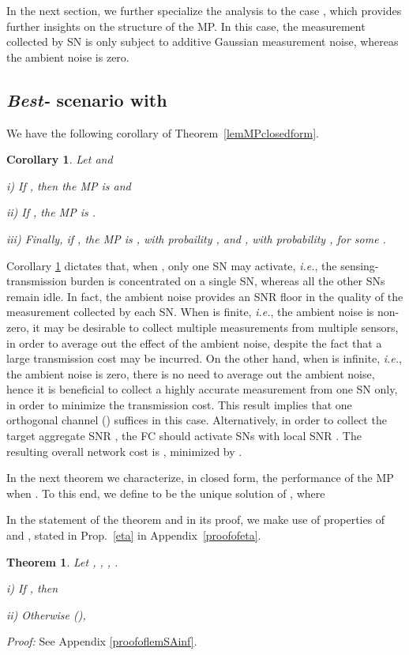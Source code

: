 \documentclass[10pt,twocolumn,twoside]{IEEEtran}
\newtheorem{thm}{Theorem}
\newtheorem{corol}{Corollary}
\theoremstyle{plain}
\begin{document}
In the next section, we further specialize the analysis to the case , which provides further insights on the structure of the MP. In this case, the measurement  collected by SN  is only subject to
additive Gaussian measurement noise, whereas the ambient noise is zero.
\vspace{-3mm}
\subsection{\emph{Best-} scenario with }
\noindent We have the following corollary of Theorem~\ref{lemMPclosedform}.
\begin{corol}
\label{corolMPclosedform}
Let 
and


\noindent \emph{i)} If  , then the MP is  and


\noindent \emph{ii)} If , the MP is .

\noindent \emph{iii)} Finally, if , the MP is
,  with probaility ,
and
 ,  with probability , for some .
\end{corol}
Corollary \ref{corolMPclosedform}
 dictates that, when , only one SN may activate, \emph{i.e.}, the sensing-transmission burden
 is concentrated on a single SN, whereas all the other SNs remain idle.
In fact, the ambient noise provides an SNR floor in the quality of the measurement collected by each SN.
When  is finite, \emph{i.e.}, the ambient noise is non-zero, it may be desirable to collect multiple measurements from multiple sensors, in order to average out the effect 
of the ambient noise, despite the fact that a large transmission cost may be incurred.
On the other hand, when  is infinite, \emph{i.e.}, the ambient noise is zero, there is no need to average out the ambient noise, hence it is beneficial to 
collect a highly accurate measurement from one SN only, in order to minimize the transmission cost.
This result implies that one orthogonal channel () suffices in this case.
Alternatively, in order to collect the target aggregate SNR , the FC should activate 
  SNs with local SNR .
 The resulting overall network cost is
 , minimized by .
  

 
 
 
In the next theorem we characterize, in closed form, the performance of the MP when .
To this end, we define
  to be the unique solution of , where
 
In the statement of the theorem and in its proof, we make use of properties of  and , stated in Prop.~\ref{eta} in Appendix~\ref{proofofeta}.
\begin{thm}
\label{lemSAinf}
Let , , , .

\noindent \emph{i)} If , then


\noindent \emph{ii)} Otherwise (),

\end{thm}
\noindent\emph{Proof:}
See  Appendix \ref{proofoflemSAinf}.
\hfill\QED
\end{document}
